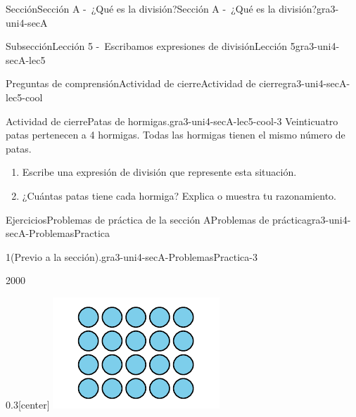 \documentclass[twoside,10pt,]{article}
\begin{document}
\begin{sectionptx}{Sección}{Sección A -~¿Qué es la división?}{}{Sección A -~¿Qué es la división?}{}{}{gra3-uni4-secA}
\begin{subsectionptx}{Subsección}{Lección 5 -~Escribamos expresiones de división}{}{Lección 5}{}{}{gra3-uni4-secA-lec5}
%
%
\typeout{************************************************}
\typeout{************************************************}
%
\begin{reading-questions-subsubsection}{Preguntas de comprensión}{Actividad de cierre}{}{Actividad de cierre}{}{}{gra3-uni4-secA-lec5-cool}
\begin{project}{Actividad de cierre}{Patas de hormigas.}{gra3-uni4-secA-lec5-cool-3}%
Veinticuatro patas pertenecen a 4 hormigas. Todas las hormigas tienen el mismo número de patas.%
\par
%
\begin{enumerate}[label=(\alph*)]
\item{}Escribe una expresión de división que represente esta situación.%
\item{}¿Cuántas patas tiene cada hormiga? Explica o muestra tu razonamiento.%
\end{enumerate}
%
\end{project}%
\end{reading-questions-subsubsection}
\end{subsectionptx}
%
%
\typeout{************************************************}
\typeout{************************************************}
%
\begin{exercises-subsection}{Ejercicios}{Problemas de práctica de la sección A}{}{Problemas de práctica}{}{}{gra3-uni4-secA-ProblemasPractica}
\begin{divisionexercise}{1}{(Previo a la sección).}{}{gra3-uni4-secA-ProblemasPractica-3}%
\begin{sidebyside}{2}{0}{0}{0}%
\begin{sbspanel}{0.3}[center]%
\includegraphics[width=\linewidth]{external/svg-source/tikz-file-151668.pdf}

\end{sbspanel}
\end{sidebyside}
\end{divisionexercise}
\end{exercises-subsection}
\end{sectionptx}
\end{document}
